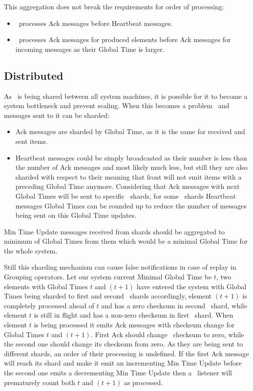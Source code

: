 This aggregation does not break the requirements for order of processing:
\begin{itemize}
	\item \tracker\ processes Ack messages before Heartbeat messages.
	\item \tracker\ processes Ack messages for produced elements before Ack messages for incoming messages as their Global Time is larger.
\end{itemize}

\subsection{Distributed \tracker\ }

As \tracker\ is being shared between all system machines, it is possible for it to become a system bottleneck and prevent scaling. When this becomes a problem \tracker\ and messages sent to it can be sharded:
\begin{itemize}
	\item Ack messages are sharded by Global Time, as it is the same for received and sent items.
	\item Heartbeat messages could be simply broadcasted as their number is less than the number of Ack messages and most likely much less, but still they are also sharded with respect to their meaning that front will not emit items with a preceding Global Time anymore. Considering that Ack messages with next Global Times will be sent to specific \tracker\ shards, for some \tracker\ shards Heartbeat messages Global Times can be rounded up to reduce the number of messages being sent on this Global Time updates.
\end{itemize}

Min Time Update messages received from shards should be aggregated to minimum of Global Times from them which would be a minimal Global Time for the whole system.

Still this sharding mechanism can cause false notifications in case of replay in Grouping operators. Let our system current Minimal Global Time be $t$, two elements with Global Times $t$ and $(t+1)$ have entered the system with Global Times being sharded to first and second \tracker\ shards accordingly, element $(t+1)$ is completely processed ahead of $t$ and has a zero checksum in second \tracker\ shard, while element $t$ is still in flight and has a non-zero checksum in first \tracker\ shard. When element $t$ is being processed it emits Ack messages with checksum change for Global Times $t$ and $(t+1)$. First Ack should change \tracker\ checksum to zero, while the second one should change its checksum from zero. As they are being sent to different shards, an order of their processing is undefined. If the first Ack message will reach its shard and make it emit an incrementing Min Time Update before the second one emits a decrementing Min Time Update then a \tracker\ listener will prematurely count both $t$ and $(t+1)$ as processed.

